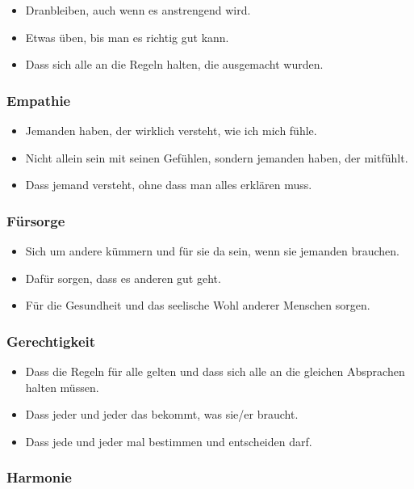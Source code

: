 \begin{itemize}
  \item Dranbleiben, auch wenn es anstrengend wird.
  \item Etwas üben, bis man es richtig gut kann.
  \item Dass sich alle an die Regeln halten, die ausgemacht wurden.
\end{itemize}


\subsubsection{Empathie}

\begin{itemize}
  \item Jemanden haben, der wirklich versteht, wie ich mich fühle.
  \item Nicht allein sein mit seinen Gefühlen, sondern jemanden haben, der mitfühlt.
  \item Dass jemand versteht, ohne dass man alles erklären muss.
\end{itemize}


\subsubsection{Fürsorge}

\begin{itemize}
  \item Sich um andere kümmern und für sie da sein, wenn sie jemanden brauchen.
  \item Dafür sorgen, dass es anderen gut geht.
  \item Für die Gesundheit und das seelische Wohl anderer Menschen sorgen.
\end{itemize}


\subsubsection{Gerechtigkeit}

\begin{itemize}
  \item Dass die Regeln für alle gelten und dass sich alle an die gleichen Absprachen halten müssen.
  \item Dass jeder und jeder das bekommt, was sie/er braucht.
  \item Dass jede und jeder mal bestimmen und entscheiden darf.
\end{itemize}


\subsubsection{Harmonie}

